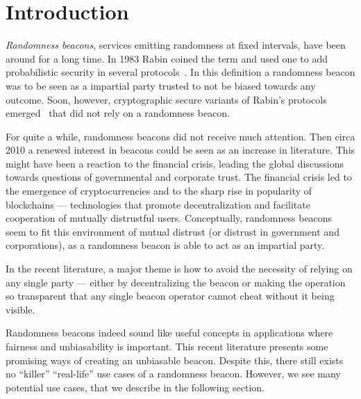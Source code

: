 \section{Introduction}

\emph{Randomness beacons}, services emitting randomness at fixed intervals, have been around for a long time.
In 1983 Rabin coined the term and used one to add probabilistic security in several protocols~.
In this definition a randomness beacon was to be seen as a impartial party trusted to not be biased towards any outcome.
Soon, however, cryptographic secure variants of Rabin's protocols emerged~ that did not rely on a randomness beacon.

For quite a while, randomness beacons did not receive much attention. Then circa 2010 a renewed interest in beacons could be seen as an increase in literature.
This might have been a reaction to the financial crisis, leading the global discussions towards questions of governmental and corporate trust.
The financial crisis led to the emergence of cryptocurrencies and to the sharp rise in popularity of blockchains --- technologies that promote decentralization and facilitate cooperation of mutually distrustful users.
Conceptually, randomness beacons seem to fit this environment of mutual distrust (or distrust in government and corporations), as a randomness beacon is able to act as an impartial party.

In the recent literature, a major theme is how to avoid the necessity of relying on any single party --- either by decentralizing the beacon or making the operation so transparent that any single beacon operator cannot cheat without it being visible.


Randomness beacons indeed sound like useful concepts in applications where fairness and unbiasability is important.
This recent literature presents some promising ways of creating an unbiasable beacon. Despite this, there still exists no \enquote{killer} \enquote{real-life} use cases of a randomness beacon.  However, we see many potential use cases, that we describe in the following section.


